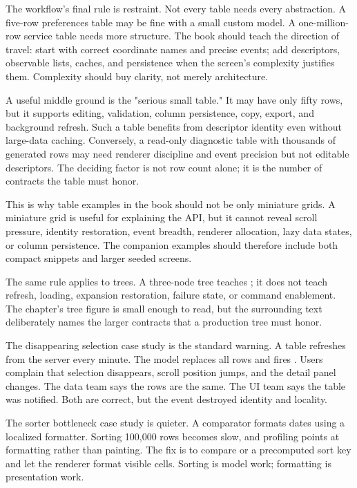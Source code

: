 The workflow's final rule is restraint. Not every table needs every abstraction. A five-row preferences table may be fine with a small custom model. A one-million-row service table needs more structure. The book should teach the direction of travel: start with correct coordinate names and precise events; add descriptors, observable lists, caches, and persistence when the screen's complexity justifies them. Complexity should buy clarity, not merely architecture.

A useful middle ground is the "serious small table." It may have only fifty rows, but it supports editing, validation, column persistence, copy, export, and background refresh. Such a table benefits from descriptor identity even without large-data caching. Conversely, a read-only diagnostic table with thousands of generated rows may need renderer discipline and event precision but not editable descriptors. The deciding factor is not row count alone; it is the number of contracts the table must honor.

This is why table examples in the book should not be only miniature grids. A miniature grid is useful for explaining the API, but it cannot reveal scroll pressure, identity restoration, event breadth, renderer allocation, lazy data states, or column persistence. The companion examples should therefore include both compact snippets and larger seeded screens.

The same rule applies to trees. A three-node tree teaches ; it does not teach refresh, loading, expansion restoration, failure state, or command enablement. The chapter's tree figure is small enough to read, but the surrounding text deliberately names the larger contracts that a production tree must honor.

The disappearing selection case study is the standard warning. A table refreshes from the server every minute. The model replaces all rows and fires . Users complain that selection disappears, scroll position jumps, and the detail panel changes. The data team says the rows are the same. The UI team says the table was notified. Both are correct, but the event destroyed identity and locality.

The sorter bottleneck case study is quieter. A comparator formats dates using a localized formatter. Sorting 100,000 rows becomes slow, and profiling points at formatting rather than painting. The fix is to compare  or a precomputed sort key and let the renderer format visible cells. Sorting is model work; formatting is presentation work.

